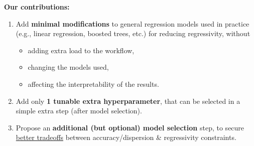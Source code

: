 \documentclass[aspectratio=169,10pt]{beamer}
\begin{document}
\begin{frame}{\frameZ}
\textbf{Our contributions:}
\medskip
    \begin{enumerate}
        \item Add \textbf{minimal modifications} to general regression models used in practice (e.g., linear regression, boosted trees, etc.) for reducing regressivity, without 
        \begin{itemize}
            \item adding extra load to the workflow,
            \item changing the models used,
             \item affecting the interpretability of the results.
        \end{itemize}

        
    \medskip
    \item Add only \textbf{1 tunable extra hyperparameter}, that can be selected in a simple extra step (after model selection). 
    \medskip
    \item Propose an \textbf{additional (but optional) model selection} step, to secure \underline{better tradeoffs} between accuracy/dispersion \& regressivity constraints.
    \end{enumerate}
\end{frame}



\newcommand{\frameA}{Regressivity in ML-based Mass Appraisal}
\end{document}
